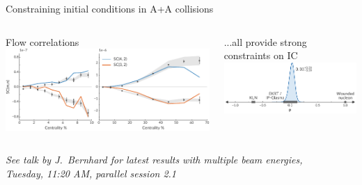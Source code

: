 \documentclass[aspectratio=43]{beamer}
\theoremstyle{definition}
\begin{document}
\begin{frame}{Constraining initial conditions in A+A collisions}
\begin{columns}
\begin{column}{.35\textwidth}
    \end{column}
  \end{columns}
  \medskip
  \begin{columns}
    \scriptsize
    \begin{column}{.55\textwidth}
      \centering
      Flow correlations \\[1ex]
      \includegraphics[width=\columnwidth]{flow_corr}
    \end{column}
    \begin{column}{.45\textwidth}
      \centering
      ...all provide strong constraints on IC \\[1ex]
      \includegraphics[width=\columnwidth]{posterior_p}
    \end{column}
  \end{columns}
  \vspace{.6 cm}
  \scriptsize
  \centering
  \emph{See talk by J.\ Bernhard for latest results with multiple beam energies,\\
        Tuesday, 11:20 AM, parallel session 2.1}
\end{frame}
\end{document}

